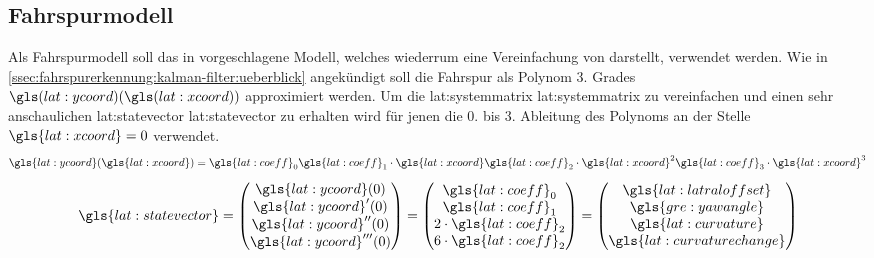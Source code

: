 \subsection{Fahrspurmodell}
Als Fahrspurmodell soll das in \autocite{petersfalkoFPGAbasierteBildverarbeitungspipelineZur2009} vorgeschlagene Modell, welches wiederrum eine Vereinfachung von \autocite{risackRobustLaneRecognition} darstellt, verwendet werden.
Wie in \ref{ssec:fahrspurerkennung:kalman-filter:ueberblick} angekündigt soll die Fahrspur als Polynom 3. Grades \begin{math} \gls(lat:ycoord)(\gls(lat:xcoord)) \end{math} approximiert werden. Um die \glsdesc{lat:systemmatrix} \gls{lat:systemmatrix} zu vereinfachen und einen sehr anschaulichen \glsdesc{lat:statevector} \gls{lat:statevector} zu erhalten wird für jenen die 0. bis 3. Ableitung des Polynoms an der Stelle \begin{math} \gls{lat:xcoord}=0 \end{math} verwendet. 
\begin{equation}
\label{eq:polylane}
\gls{lat:ycoord}(\gls{lat:xcoord}) =
\gls{lat:coeff}_0
\gls{lat:coeff}_1 \cdot \gls{lat:xcoord}
\gls{lat:coeff}_2 \cdot \gls{lat:xcoord}^2
\gls{lat:coeff}_3 \cdot \gls{lat:xcoord}^3
\end{equation}
\begin{equation}
\label{eq:statevectorlane}
\gls{lat:statevector} = 
\begin{pmatrix}
\gls{lat:ycoord}(0) \\
\gls{lat:ycoord}^\prime(0) \\
\gls{lat:ycoord}^{\prime\prime}(0) \\
\gls{lat:ycoord}^{\prime\prime\prime}(0) \\
\end{pmatrix}
=
\begin{pmatrix}
\gls{lat:coeff}_0 \\
\gls{lat:coeff}_1 \\
2 \cdot \gls{lat:coeff}_2 \\
6 \cdot \gls{lat:coeff}_2 \\
\end{pmatrix}
=
\begin{pmatrix}
\gls{lat:latraloffset} \\
\gls{gre:yawangle} \\
\gls{lat:curvature} \\
\gls{lat:curvaturechange} \\
\end{pmatrix}
\end{equation}
 
